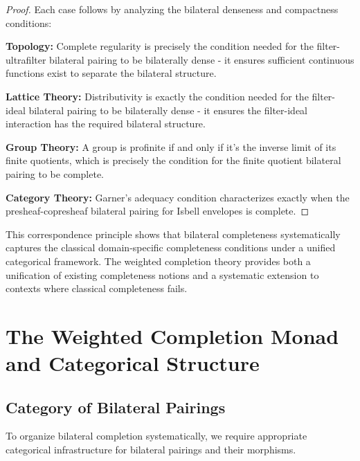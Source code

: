 \documentclass[11pt]{article}
\theoremstyle{plain}
\theoremstyle{definition}
\theoremstyle{remark}
\begin{document}
\begin{proof}
Each case follows by analyzing the bilateral denseness and compactness conditions:

\textbf{Topology:} Complete regularity is precisely the condition needed for the filter-ultrafilter bilateral pairing to be bilaterally dense - it ensures sufficient continuous functions exist to separate the bilateral structure.

\textbf{Lattice Theory:} Distributivity is exactly the condition needed for the filter-ideal bilateral pairing to be bilaterally dense - it ensures the filter-ideal interaction has the required bilateral structure.

\textbf{Group Theory:} A group is profinite if and only if it's the inverse limit of its finite quotients, which is precisely the condition for the finite quotient bilateral pairing to be complete.

\textbf{Category Theory:} Garner's adequacy condition characterizes exactly when the presheaf-copresheaf bilateral pairing for Isbell envelopes is complete.
\end{proof}

This correspondence principle shows that bilateral completeness systematically captures the classical domain-specific completeness conditions under a unified categorical framework. The weighted completion theory provides both a unification of existing completeness notions and a systematic extension to contexts where classical completeness fails.

\section{The Weighted Completion Monad and Categorical Structure}

\subsection{Category of Bilateral Pairings}

To organize bilateral completion systematically, we require appropriate categorical infrastructure for bilateral pairings and their morphisms.
\end{document}
